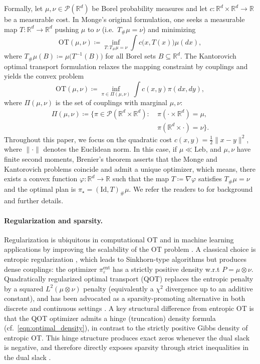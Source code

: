 \documentclass{article}
\theoremstyle{plain}
\theoremstyle{definition}
\theoremstyle{remark}
\numberwithin{equation}{section}
\newcommand{\R}{\mathbb{R}}
\newcommand{\OT}{\mathrm{OT}}
\newcommand{\Leb}{\mathrm{Leb}}
\begin{document}
Formally, let $\mu,\nu\in\mathcal P(\R^d)$ be Borel probability measures and let $c:\R^d\times\R^d\to\R$ be a measurable cost.
In Monge's original formulation, one seeks a measurable map $T:\R^d\to\R^d$ pushing $\mu$ to $\nu$ (i.e.\ $T_\#\mu=\nu$) and minimizing
\[
\OT(\mu,\nu)\coloneqq\inf_{T:T_\#\mu=\nu}\int c\bigl(x,T(x)\bigr)\mu(dx),
\]
where $T_\#\mu(B)\coloneqq\mu\bigl(T^{-1}(B)\bigr)$ for all Borel sets $B\subseteq\R^d$.
The Kantorovich optimal transport formulation \citep{kantorovich1942transfer} relaxes the mapping constraint by couplings and yields the convex problem
\[
\OT(\mu,\nu)\coloneqq\inf_{\pi\in\Pi(\mu,\nu)}\int c(x,y)\pi(dx,dy),    
\]
where $\Pi(\mu,\nu)$ is the set of couplings with marginal $\mu,\nu$:
\[
\begin{aligned}
\Pi(\mu,\nu)\coloneqq\{\pi\in\mathcal P(\R^d\times\R^d):\ &\pi(\cdot\times\R^d)=\mu,\\
&\pi(\R^d\times\cdot)=\nu\}.
\end{aligned}
\]
Throughout this paper, we focus on the quadratic cost $c(x,y)=\frac12\|x-y\|^2$, where $\|\cdot\|$ denotes the Euclidean norm. 
In this case, if $\mu\ll\Leb$, and $\mu,\nu$ have finite second moments, Brenier's theorem \citep{brenier1991polar} asserts that the Monge and Kantorovich problems coincide and admit a unique optimizer, which means, there exists a convex function $\varphi:\R^d\to\R$ such that the map $T\coloneqq\nabla\varphi$ satisfies $T_\#\mu=\nu$ and the optimal plan is $\pi_\star=(\mathrm{Id}, T)_\#\mu$. 
We refer the readers to \citet{villani2008optimal} for background and further details.


\paragraph{Regularization and sparsity.}
Regularization is ubiquitous in computational OT and in machine learning applications by improving the scalability of the OT problem \citep{peyre2019computational}.
A classical choice is entropic regularization \citep{cuturi2013sinkhorn}, which leads to Sinkhorn-type algorithms but produces dense couplings: the optimizer $\pi^{\mathrm{ent}}_\varepsilon$ has a strictly positive density w.r.t $P=\mu\otimes\nu$.
Quadratically regularized optimal transport (QOT) replaces the entropic penalty by a squared $L^2(\mu\otimes\nu)$ penalty (equivalently a $\chi^2$ divergence up to an additive constant), and has been advocated as a sparsity-promoting alternative in both discrete and continuous settings \citep{blondel2018smooth,seguy2018large,essid2018quadratically,lorenz2021quadratically}.
A key structural difference from entropic OT is that the QOT optimizer admits a hinge (truncation) density formula (cf.\ \eqref{eqn:optimal_density}), in contrast to the strictly positive Gibbs density of entropic OT.
This hinge structure produces exact zeros whenever the dual slack is negative, and therefore directly exposes sparsity through strict inequalities in the dual slack \citep{lorenz2021quadratically,nutz2025quadratically}.
\end{document}
